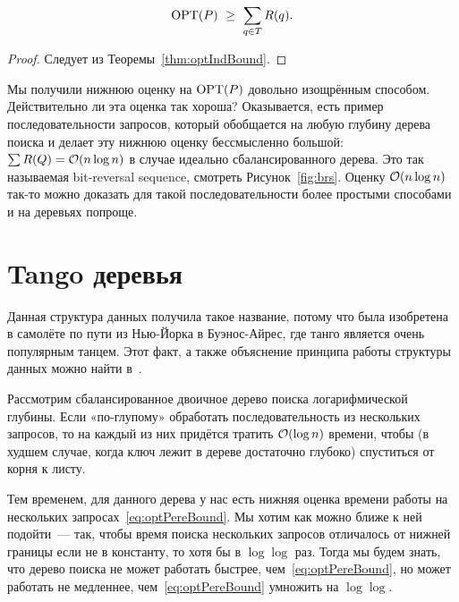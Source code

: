\begin{theorem} \label{thm:optPereBound}
\begin{equation} \label{eq:optPereBound}
	\operatorname{OPT}(P)\ \ge\ \sum\limits_{q \in T} R(q).
\end{equation}
\end{theorem}

\begin{proof}
Следует из Теоремы~\ref{thm:optIndBound}.
\end{proof}

Мы получили нижнюю оценку на $\operatorname{OPT}(P)$ довольно изощрённым способом. Действительно ли эта оценка так хороша? Оказывается, есть пример последовательности запросов, который обобщается на любую глубину дерева поиска и делает эту нижнюю оценку бессмысленно большой: $\sum R(Q) = \mathcal{O}(n \log n)$ в случае идеально сбалансированного дерева. Это так называемая bit-reversal sequence, смотреть Рисунок~\ref{fig:brs}. Оценку $\mathcal{O}(n \log n)$ так-то можно доказать для такой последовательности более простыми способами и на деревьях попроще.



\section{Tango деревья} 

Данная структура данных получила такое название, потому что была изобретена
в самолёте по пути из Нью-Йорка в Буэнос-Айрес, где танго является
очень популярным танцем. Этот факт, а также объяснение принципа работы
структуры данных можно найти в~\cite{demaineTangoVideo}.

Рассмотрим сбалансированное двоичное дерево поиска логарифмической глубины. Если «по-глупому» обработать последовательность из нескольких запросов, то на каждый из них придётся тратить $\mathcal{O} (\log n)$ времени, чтобы (в худшем случае, когда ключ лежит в дереве достаточно глубоко) спуститься от корня к листу.

Тем временем, для данного дерева у нас есть нижняя оценка времени работы на нескольких запросах~\eqref{eq:optPereBound}. Мы хотим как можно ближе к ней подойти~--- так, чтобы время поиска нескольких запросов отличалось от нижней границы если не в константу, то хотя бы в $\log \log$ раз. Тогда мы будем знать, что дерево поиска не может работать быстрее, чем~\eqref{eq:optPereBound}, но может работать не медленнее, чем~\eqref{eq:optPereBound} умножить на $\log \log$.

